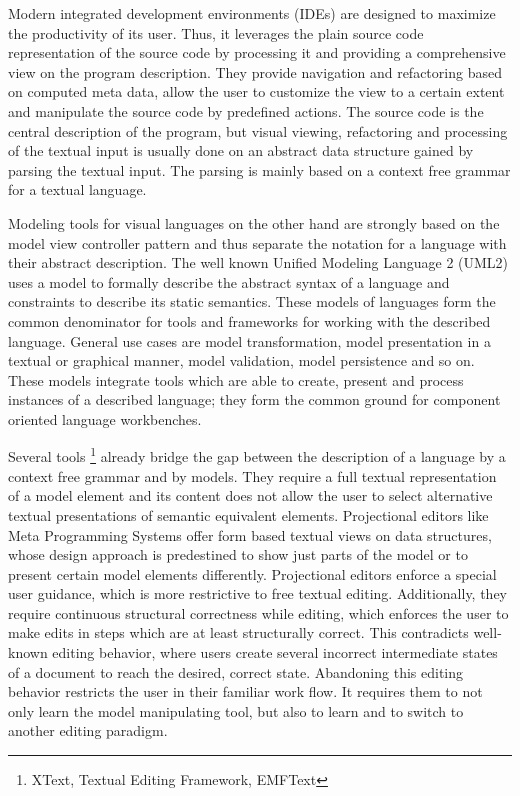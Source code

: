 Modern integrated development environments (IDEs) are designed to maximize the productivity of its user. Thus, it leverages the plain source code representation of the source code by processing it and providing a comprehensive view on the program description. They provide navigation and refactoring based on computed meta data, allow the user to customize the view to a certain extent and manipulate the source code by predefined actions. The source code is the central description of the program, but visual viewing, refactoring and processing of the textual input is usually done on an abstract data structure gained by parsing the textual input. The parsing is mainly based on a context free grammar for a textual language. 

Modeling tools for visual languages on the other hand are strongly based on the model view controller pattern and thus separate the notation for a language with their abstract description. The well known Unified Modeling Language 2 (UML2) uses a model to formally describe the abstract syntax of a language and constraints to describe its static semantics. These models of languages form the common denominator for tools and frameworks for working with the described language. General use cases are model transformation, model presentation in a textual or graphical manner, model validation, model persistence and so on. These models integrate tools which are able to create, present and process instances of a described language; they form the common ground for component oriented language workbenches. 

Several tools \footnote{\raggedright XText, Textual Editing Framework, EMFText} already bridge the gap between the description of a language by a context free grammar and by models. They require a full textual representation of a model element and its content does not allow the user to select alternative textual presentations of semantic equivalent elements. Projectional editors like Meta Programming Systems offer form based textual views on data structures, whose design approach is predestined to show just parts of the model or to present certain model elements differently. Projectional editors enforce a special user guidance, which is more restrictive to free textual editing. Additionally, they require continuous structural correctness while editing, which enforces the user to make edits in steps which are at least structurally correct. This contradicts well-known editing behavior, where users create several incorrect intermediate states of a document to reach the desired, correct state. Abandoning this editing behavior restricts the user in their familiar work flow. It requires them to not only learn the model manipulating tool, but also to learn and to switch to another editing paradigm. 

